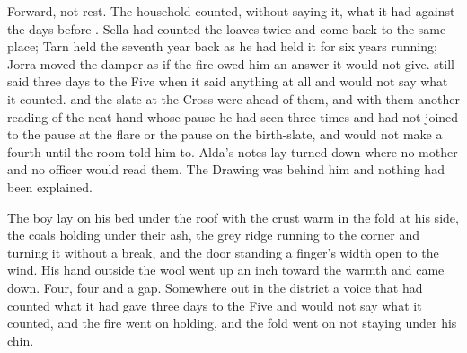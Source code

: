 Forward, not rest. The household counted, without saying it, what it had against the days before . Sella had counted the loaves twice and come back to the same place; Tarn held the seventh year back as he had held it for six years running; Jorra moved the damper as if the fire owed him an answer it would not give.  still said three days to the Five when it said anything at all and would not say what it counted.  and the slate at the Cross were ahead of them, and with them another reading of the neat hand whose pause he had seen three times and had not joined to the pause at the flare or the pause on the birth-slate, and would not make a fourth until the room told him to. Alda's notes lay turned down where no mother and no officer would read them. The Drawing was behind him and nothing had been explained.

The boy lay on his bed under the roof with the crust warm in the fold at his side, the coals holding under their ash, the grey ridge running to the corner and turning it without a break, and the door standing a finger's width open to the wind. His hand outside the wool went up an inch toward the warmth and came down. Four, four and a gap. Somewhere out in the district a voice that had counted what it had gave three days to the Five and would not say what it counted, and the fire went on holding, and the fold went on not staying under his chin.
